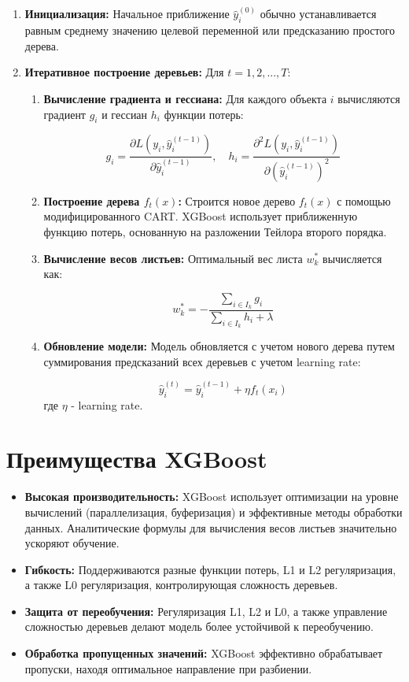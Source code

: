 \begin{enumerate}
    \item \textbf{Инициализация:} Начальное приближение $\hat{y}_i^{(0)}$ обычно устанавливается равным среднему значению целевой переменной или предсказанию простого дерева.

    \item \textbf{Итеративное построение деревьев:} Для $t = 1, 2, ..., T$:
    \begin{enumerate}
        \item \textbf{Вычисление градиента и гессиана:}  Для каждого объекта $i$ вычисляются градиент $g_i$ и гессиан $h_i$ функции потерь:
        
        \[
        g_i = \frac{\partial L(y_i, \hat{y}_i^{(t-1)})}{\partial \hat{y}_i^{(t-1)}}, \quad h_i = \frac{\partial^2 L(y_i, \hat{y}_i^{(t-1)})}{\partial (\hat{y}_i^{(t-1)})^2}
        \]

        \item \textbf{Построение дерева $f_t(x)$:}  Строится новое дерево $f_t(x)$ с помощью модифицированного CART.  XGBoost использует приближенную функцию потерь, основанную на разложении Тейлора второго порядка.


        \item \textbf{Вычисление весов листьев:}  Оптимальный вес листа $w_k^*$ вычисляется как:
        
        \[
        w_k^* = - \frac{\sum_{i \in I_k} g_i}{\sum_{i \in I_k} h_i + \lambda}
        \]
        
        \item \textbf{Обновление модели:} Модель обновляется с учетом нового дерева путем суммирования предсказаний всех деревьев с учетом learning rate:
        
        \[
        \hat{y}_i^{(t)} = \hat{y}_i^{(t-1)} + \eta f_t(x_i)
        \]
        где $\eta$ - learning rate.

    \end{enumerate}
\end{enumerate}

\section*{Преимущества XGBoost}

\begin{itemize}
    \item \textbf{Высокая производительность:}  XGBoost использует оптимизации на уровне вычислений (параллелизация, буферизация) и эффективные методы обработки данных. Аналитические формулы для вычисления весов листьев значительно ускоряют обучение.
    \item \textbf{Гибкость:} Поддерживаются разные функции потерь, L1 и L2 регуляризация, а также L0 регуляризация, контролирующая сложность деревьев.
    \item \textbf{Защита от переобучения:}  Регуляризация L1, L2 и L0, а также управление сложностью деревьев делают модель более устойчивой к переобучению.
    \item \textbf{Обработка пропущенных значений:} XGBoost эффективно обрабатывает пропуски, находя оптимальное направление при разбиении.
\end{itemize}

